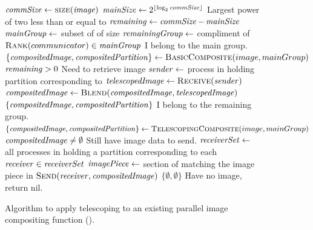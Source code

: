 \documentclass{sig-alternate}
\begin{document}
\begin{figure}
  \begin{codebox}
    \li $\id{commSize} \leftarrow \proc{size}(\id{image})$
    \li $\id{mainSize} \leftarrow 2^{\lfloor \log_{2} \id{commSize} \rfloor}$
        \Comment Largest power of two less than or equal to 
    \li $\id{remaining} \leftarrow \id{commSize} - \id{mainSize}$
    \li $\id{mainGroup} \leftarrow$ subset of  of size 
    \li $\id{remainingGroup} \leftarrow$ compliment of 
    \li \If $\proc{Rank}(communicator) \in \id{mainGroup}$
    \zi \Then \Comment I belong to the main group.
    \li       $\{ \id{compositedImage}, \id{compositedPartition} \} \leftarrow \proc{BasicComposite}(image, mainGroup)$
    \li       \If $\id{remaining} > 0$
    \zi       \Then \Comment Need to retrieve image
    \li             $\id{sender} \leftarrow$ process in  holding partition corresponding to 
    \label{line:SenderIndexMagic}
    \li             $\id{telescopedImage} \leftarrow \proc{Receive}(\id{sender})$
    \li             $\id{compositedImage} \leftarrow \proc{Blend}(\id{compositedImage}, \id{telescopedImage})$
              \End
    \li       \Return $\{ \id{compositedImage}, \id{compositedPartition} \}$
    \zi \Else \Comment I belong to the remaining group.
    \li       $\{ \id{compositedImage}, \id{compositedPartition} \} \leftarrow \proc{TelescopingComposite}(image, mainGroup)$
    \li       \If $\id{compositedImage} \neq \emptyset$
    \zi       \Then \Comment Still have image data to send.
    \li             $\id{receiverSet} \leftarrow$ all processes in  holding a partition corresponding to 
    \label{line:ReceiverIndexMagic}
    \li             \For each $\id{receiver} \in \id{receiverSet}$
    \zi             \Do
    \li                  $\id{imagePiece} \leftarrow$ section of  matching the image piece in 
    \li                  $\proc{Send}(\id{receiver}, \id{compositedImage})$
                    \End
              \End
    \li       \Return $\{ \emptyset, \emptyset \}$ \Comment Have no image, return nil.
        \End
  \end{codebox}
  \vspace*{-18pt}
  \caption{Algorithm to apply telescoping to an existing parallel image
    compositing function ().}
  \label{fig:TelescopingComposite}
\end{figure}
\end{document}
